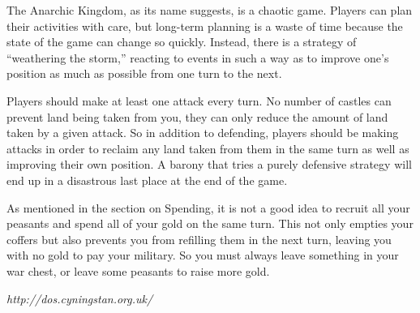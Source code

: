 \documentclass[8pt]{extarticle}
\begin{document}
\begin{multicols}{2}
\noindent
The Anarchic Kingdom, as its name suggests, is a chaotic game. Players can plan their activities with care, but long-term planning is a waste of time because the state of the game can change so quickly. Instead, there is a strategy of ``weathering the storm,'' reacting to events in such a way as to improve one's position as much as possible from one turn to the next.

Players should make at least one attack every turn. No number of castles can prevent land being taken from you, they can only reduce the amount of land taken by a given attack. So in addition to defending, players should be making attacks in order to reclaim any land taken from them in the same turn as well as improving their own position. A barony that tries a purely defensive strategy will end up in a disastrous last place at the end of the game.

As mentioned in the section on Spending, it is not a good idea to recruit all your peasants and spend all of your gold on the same turn. This not only empties your coffers but also prevents you from refilling them in the next turn, leaving you with no gold to pay your military. So you must always leave something in your war chest, or leave some peasants to raise more gold.
\end{multicols}

%
%

\null
\vfill
\begin{center}
\emph{http://dos.cyningstan.org.uk/}
\end{center}
\end{document}
